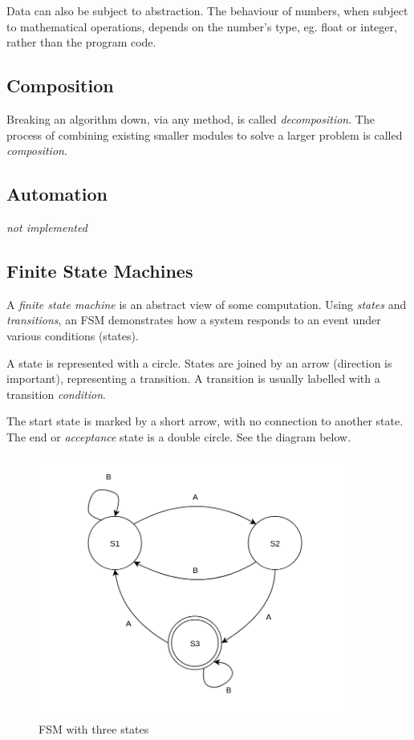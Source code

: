\documentclass[9pt]{article}
\begin{document}
Data can also be subject to abstraction. The behaviour of numbers, when subject to mathematical operations, depends on the number's type, eg. float or integer, rather than the program code.

\subsection{Composition}
\label{sec:org3e45b64}

Breaking an algorithm down, via any method, is called \emph{decomposition}. The process of combining existing smaller modules to solve a larger problem is called \emph{composition}.

\subsection{Automation}
\label{sec:org02ab914}

\emph{not implemented}

\subsection{Finite State Machines}
\label{sec:orgd3c9f99}

A \emph{finite state machine} is an abstract view of some computation. Using \emph{states} and \emph{transitions}, an FSM demonstrates how a system responds to an event under various conditions (states).

A state is represented with a circle. States are joined by an arrow (direction is important), representing a transition. A transition is usually labelled with a transition \emph{condition}.

The start state is marked by a short arrow, with no connection to another state. The end or \emph{acceptance} state is a double circle. See the diagram below.

\begin{figure}[H]
\centering
\includegraphics[width=0.9\textwidth,keepaspectratio, frame]{./images/fsm.png}
\caption{FSM with three states}
\end{figure}
\end{document}
